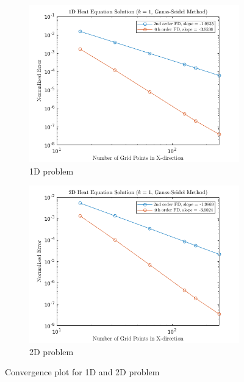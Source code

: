 \documentclass{article}
\begin{document}
\begin{figure}[ht]
    \centering
    \begin{subfigure}[t]{.5\textwidth}
        \centering
        \includegraphics[width=1.0\linewidth]{dim1_GS.png}
        \caption{1D problem}
    \label{fig:conv1d}
    \end{subfigure}%
    \begin{subfigure}[t]{.5\textwidth}
        \centering
        \includegraphics[width=1.0\linewidth]{dim2_GS.png}
        \caption{2D problem}
    \label{fig:conv2d}
    \end{subfigure}
    \caption{Convergence plot for 1D and 2D problem}
\label{fig:conv}
\end{figure}
\end{document}
